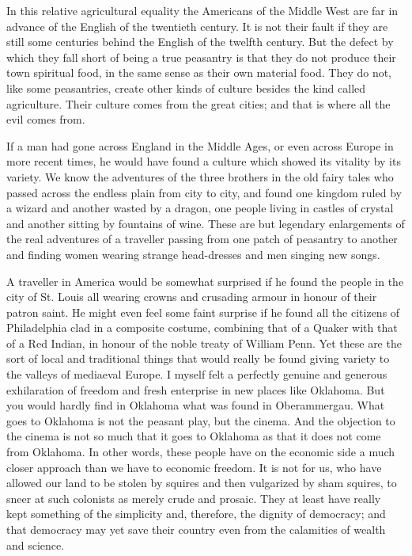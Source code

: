 \documentclass{book}
\begin{document}
In this relative agricultural equality the Americans of the Middle West are far in advance of the English of the twentieth century. It is not their fault if they are still some centuries behind the English of the twelfth century. But the defect by which they fall short of being a true peasantry is that they do not produce their town spiritual food, in the same sense as their own material food. They do not, like some peasantries, create other kinds of culture besides the kind called agriculture. Their culture comes from the great cities; and that is where all the evil comes from.

If a man had gone across England in the Middle Ages, or even across Europe in more recent times, he would have found a culture which showed its vitality by its variety. We know the adventures of the three brothers in the old fairy tales who passed across the endless plain from city to city, and found one kingdom ruled by a wizard and another wasted by a dragon, one people living in castles of crystal and another sitting by fountains of wine. These are but legendary enlargements of the real adventures of a traveller passing from one patch of peasantry to another and finding women wearing strange head-dresses and men singing new songs.

A traveller in America would be somewhat surprised if he found the people in the city of St. Louis all wearing crowns and crusading armour in honour of their patron saint. He might even feel some faint surprise if he found all the citizens of Philadelphia clad in a composite costume, combining that of a Quaker with that of a Red Indian, in honour of the noble treaty of William Penn. Yet these are the sort of local and traditional things that would really be found giving variety to the valleys of mediaeval Europe. I myself felt a perfectly genuine and generous exhilaration of freedom and fresh enterprise in new places like Oklahoma. But you would hardly find in Oklahoma what was found in Oberammergau. What goes to Oklahoma is not the peasant play, but the cinema. And the objection to the cinema is not so much that it goes to Oklahoma as that it does not come from Oklahoma. In other words, these people have on the economic side a much closer approach than we have to economic freedom. It is not for us, who have allowed our land to be stolen by squires and then vulgarized by sham squires, to sneer at such colonists as merely crude and prosaic. They at least have really kept something of the simplicity and, therefore, the dignity of democracy; and that democracy may yet save their country even from the calamities of wealth and science.
\end{document}
